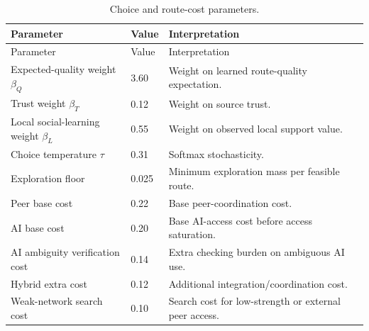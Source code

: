 \documentclass[11pt]{article}
\begin{document}
\begin{longtable}{p{}p{}p{}}
\caption{Choice and route-cost parameters.}\label{tab:param_choice}\\
\toprule Parameter & Value & Interpretation \\
\midrule\endfirsthead\toprule Parameter & Value & Interpretation \\
\midrule\endhead
Expected-quality weight $\beta_Q$ & 3.60 & Weight on learned route-quality expectation. \\
Trust weight $\beta_T$ & 0.12 & Weight on source trust. \\
Local social-learning weight $\beta_L$ & 0.55 & Weight on observed local support value. \\
Choice temperature $\tau$ & 0.31 & Softmax stochasticity. \\
Exploration floor & 0.025 & Minimum exploration mass per feasible route. \\
Peer base cost & 0.22 & Base peer-coordination cost. \\
AI base cost & 0.20 & Base AI-access cost before access saturation. \\
AI ambiguity verification cost & 0.14 & Extra checking burden on ambiguous AI use. \\
Hybrid extra cost & 0.12 & Additional integration/coordination cost. \\
Weak-network search cost & 0.10 & Search cost for low-strength or external peer access. \\
\bottomrule
\end{longtable}
\end{document}
